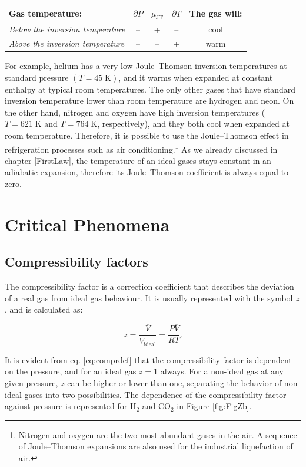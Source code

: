 \documentclass[
  9pt,
]{extbook}
\theoremstyle{definition}
\theoremstyle{definition}
\theoremstyle{definition}
\theoremstyle{remark}
\begin{document}
\begin{longtable}[]{@{}lcccc@{}}
\toprule
Gas temperature: & \(\partial P\) & \(\mu_{\mathrm{JT}}\) & \(\partial T\) & The gas will:\tabularnewline
\midrule
\endhead
\emph{Below the inversion temperature} & -- & + & -- & cool\tabularnewline
\emph{Above the inversion temperature} & -- & -- & + & warm\tabularnewline
\bottomrule
\end{longtable}

For example, helium has a very low Joule--Thomson inversion temperatures at standard pressure \((T=45\;\text{K})\), and it warms when expanded at constant enthalpy at typical room temperatures. The only other gases that have standard inversion temperature lower than room temperature are hydrogen and neon. On the other hand, nitrogen and oxygen have high inversion temperatures (\(T=621\;\text{K}\) and \(T=764\;\text{K}\), respectively), and they both cool when expanded at room temperature. Therefore, it is possible to use the Joule--Thomson effect in refrigeration processes such as air conditioning.\footnote{Nitrogen and oxygen are the two most abundant gases in the air. A sequence of Joule--Thomson expansions are also used for the industrial liquefaction of air.} As we already discussed in chapter \ref{FirstLaw}, the temperature of an ideal gases stays constant in an adiabatic expansion, therefore its Joule--Thomson coefficient is always equal to zero.

\hypertarget{critical-phenomena}{%
\section{Critical Phenomena}\label{critical-phenomena}}

\hypertarget{compressibility-factors}{%
\subsection{Compressibility factors}\label{compressibility-factors}}

The compressibility factor is a correction coefficient that describes the deviation of a real gas from ideal gas behaviour. It is usually represented with the symbol \(z\), and is calculated as:

\begin{equation}
z=\frac{\overline{V}}{\overline{V}_{\text{ideal}}} = \frac{P \overline{V}}{RT}.
\label{eq:comprdef}
\end{equation}

It is evident from eq. \eqref{eq:comprdef} that the compressibility factor is dependent on the pressure, and for an ideal gas \(z=1\) always. For a non-ideal gas at any given pressure, \(z\) can be higher or lower than one, separating the behavior of non-ideal gases into two possibilities. The dependence of the compressibility factor against pressure is represented for \(\mathrm{H}_2\) and \(\mathrm{CO}_2\) in Figure \ref{fig:FigZb}.
\end{document}
